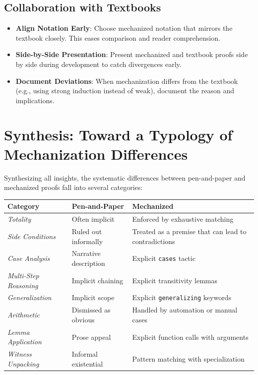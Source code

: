 \subsection*{Collaboration with Textbooks}
\begin{itemize}
    \item \textbf{Align Notation Early}:
    Choose mechanized notation that mirrors the textbook closely.
    This eases comparison and reader comprehension.
    
    \item \textbf{Side-by-Side Presentation}:
    Present mechanized and textbook proofs side by side during
    development to catch divergences early.
    
    \item \textbf{Document Deviations}:
    When mechanization differs from the textbook
    (e.g., using strong induction instead of weak),
    document the reason and implications.
\end{itemize}

%
%
%
\section{Synthesis: Toward a Typology of Mechanization Differences}
\label{discussion:sec:synthesis}

Synthesizing all insights,
the systematic differences between pen-and-paper and
mechanized proofs fall into several categories:

\begin{table}[h]
    \centering
    \begin{tabular}{p{3cm}|p{4cm}|p{4cm}}
        \hline
        \textbf{Category} & \textbf{Pen-and-Paper} & \textbf{Mechanized} \\
        \hline
        \textit{Totality} & Often implicit & Enforced by exhaustive matching \\
        \hline
        \textit{Side Conditions} & Ruled out informally & Treated as a premise that can lead to contradictions \\
        \hline
        \textit{Case Analysis} & Narrative description & Explicit \texttt{cases} tactic \\
        \hline
        \textit{Multi-Step Reasoning} & Implicit chaining & Explicit transitivity lemmas \\
        \hline
        \textit{Generalization} & Implicit scope & Explicit \texttt{generalizing} keywords \\
        \hline
        \textit{Arithmetic} & Dismissed as obvious & Handled by automation or manual cases \\
        \hline
        \textit{Lemma Application} & Prose appeal & Explicit function calls with arguments \\
        \hline
        \textit{Witness Unpacking} & Informal existential & Pattern matching with specialization \\
        \hline
    \end{tabular}
\end{table}

